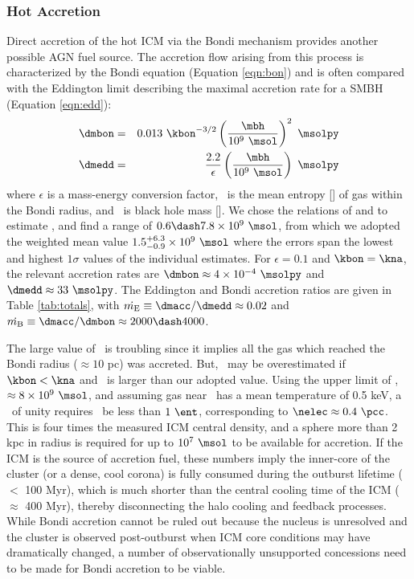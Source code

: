 \documentclass[11pt, preprint]{aastex}
\begin{document}
\subsubsection{Hot Accretion}

Direct accretion of the hot ICM via the Bondi mechanism provides
another possible AGN fuel source. The accretion flow arising from this
process is characterized by the Bondi equation (Equation
\ref{eqn:bon}) and is often compared with the Eddington limit
describing the maximal accretion rate for a SMBH (Equation
\ref{eqn:edd}):
\begin{eqnarray}
  \dmbon &=& 0.013 ~\kbon^{-3/2} \left(\frac{\mbh}{10^9
    ~\msol}\right)^{2} ~\msolpy \label{eqn:bon}\\
  \dmedd &=& \frac{2.2}{\epsilon} \left(\frac{\mbh}{10^9~\msol}\right)
  ~\msolpy  \label{eqn:edd}
\end{eqnarray}
where $\epsilon$ is a mass-energy conversion factor, \kbon\ is the
mean entropy [\ent] of gas within the Bondi radius, and \mbh\ is black
hole mass [\msol]. We chose the relations of
\citet{2002ApJ...574..740T} and \citet{2007MNRAS.379..711G} to
estimate \mbh, and find a range of $0.6 \dash 7.8 \times 10^9 ~\msol$,
from which we adopted the weighted mean value $1.5^{+6.3}_{-0.9}
\times 10^9 ~\msol$ where the errors span the lowest and highest
$1\sigma$ values of the individual estimates. For $\epsilon = 0.1$ and
$\kbon = \kna$, the relevant accretion rates are $\dmbon \approx 4
\times 10^{-4} ~\msolpy$ and $\dmedd \approx 33 ~\msolpy$. The
Eddington and Bondi accretion ratios are given in Table
\ref{tab:totals}, with $\dme \equiv \dmacc/\dmedd \approx 0.02$ and
$\dmb \equiv \dmacc/\dmbon \approx 2000 \dash 4000$.

The large value of \dmb\ is troubling since it implies all the gas
which reached the Bondi radius ($\approx 10$ pc) was accreted. But,
\dmb\ may be overestimated if $\kbon < \kna$ and \mbh\ is larger than
our adopted value. Using the upper limit of \mbh, $\approx 8 \times
10^9 ~\msol$, and assuming gas near \rbon\ has a mean temperature of
0.5 keV, a \dmb\ of unity requires \kbon\ be less than $1 ~\ent$,
corresponding to $\nelec \approx 0.4 ~\pcc$. This is four times the
measured ICM central density, and a sphere more than 2 kpc in radius
is required for up to $10^7 ~\msol$ to be available for accretion. If
the ICM is the source of accretion fuel, these numbers imply the
inner-core of the cluster (or a dense, cool corona) is fully consumed
during the outburst lifetime ($<$ 100 Myr), which is much shorter than
the central cooling time of the ICM ($\approx$ 400 Myr), thereby
disconnecting the halo cooling and feedback processes. While Bondi
accretion cannot be ruled out because the nucleus is unresolved and
the cluster is observed post-outburst when ICM core conditions may
have dramatically changed, a number of observationally unsupported
concessions need to be made for Bondi accretion to be viable.
\end{document}
